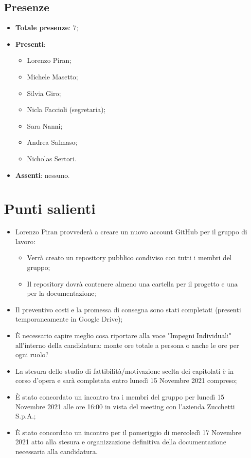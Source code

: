 \documentclass[11pt]{article}
\begin{document}
	\subsection{Presenze}
	\begin{itemize}
		\item \textbf{Totale presenze}: 7;
		\item \textbf{Presenti}:
		\begin{itemize}
			\item Lorenzo Piran;
			\item Michele Masetto;
			\item Silvia Giro;
			\item Nicla Faccioli (segretaria);
			\item Sara Nanni;
			\item Andrea Salmaso;
			\item Nicholas Sertori.		
		\end{itemize}
		\item \textbf{Assenti}: nessuno.
	\end{itemize}

	\newpage

	\section{Punti salienti}
		\begin{itemize}
			\item Lorenzo Piran provvederà a creare un nuovo account GitHub per il gruppo di lavoro:
			\begin{itemize}
				\item Verrà creato un repository pubblico condiviso con tutti i membri del gruppo;
				\item Il repository dovrà contenere almeno una cartella per il progetto e una per la documentazione;
			\end{itemize}
			\item Il preventivo costi e la promessa di consegna sono stati completati (presenti temporaneamente
			in Google Drive);
			\item È necessario capire meglio cosa riportare alla voce "Impegni Individuali" all'interno della
			candidatura: monte ore totale a persona o anche le ore per ogni ruolo?
			\item La stesura dello studio di fattibilità/motivazione scelta dei capitolati è in corso d'opera e
			sarà completata entro lunedì 15 Novembre 2021 compreso;
			\item È stato concordato un incontro tra i membri del gruppo per lunedì 15 Novembre 2021 alle ore 16:00 in
			vista del meeting con l'azienda Zucchetti S.p.A.;
			\item È stato concordato un incontro per il pomeriggio di mercoledì 17 Novembre 2021 atto alla stesura e
			organizzazione definitiva della documentazione necessaria alla candidatura.
		\end{itemize}
\end{document}
